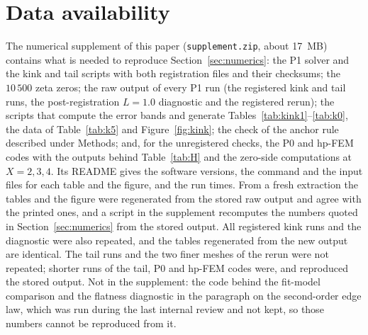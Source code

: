 \documentclass[11pt]{amsart}
\theoremstyle{definition}
\theoremstyle{remark}
\numberwithin{equation}{section}
\begin{document}
\section*{Data availability}
The numerical supplement of this paper (\texttt{supplement.zip}, about 17~MB) contains what is needed to reproduce Section~\ref{sec:numerics}: the P1 solver and the kink and tail scripts with both registration files and their checksums; the $10\,500$ zeta zeros; the raw output of every P1 run (the registered kink and tail runs, the post-registration $L=1.0$ diagnostic and the registered rerun); the scripts that compute the error bands and generate Tables~\ref{tab:kink1}--\ref{tab:k0}, the data of Table~\ref{tab:k5} and Figure~\ref{fig:kink}; the check of the anchor rule described under Methods; and, for the unregistered checks, the P0 and hp-FEM codes with the outputs behind Table~\ref{tab:H} and the zero-side computations at $X=2,3,4$. Its README gives the software versions, the command and the input files for each table and the figure, and the run times. From a fresh extraction the tables and the figure were regenerated from the stored raw output and agree with the printed ones, and a script in the supplement recomputes the numbers quoted in Section~\ref{sec:numerics} from the stored output. All registered kink runs and the diagnostic were also repeated, and the tables regenerated from the new output are identical. The tail runs and the two finer meshes of the rerun were not repeated; shorter runs of the tail, P0 and hp-FEM codes were, and reproduced the stored output. Not in the supplement: the code behind the fit-model comparison and the flatness diagnostic in the paragraph on the second-order edge law, which was run during the last internal review and not kept, so those numbers cannot be reproduced from it.
\end{document}
